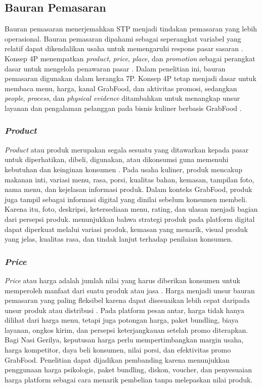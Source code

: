 \subsection{Bauran Pemasaran}
Bauran pemasaran menerjemahkan STP menjadi tindakan pemasaran yang lebih operasional. Bauran pemasaran dipahami sebagai seperangkat variabel yang relatif dapat dikendalikan usaha untuk memengaruhi respons pasar sasaran \parencite{assauri2017manajemenpemasaran,kotler2021marketingmanagement}. Konsep 4P menempatkan \textit{product}, \textit{price}, \textit{place}, dan \textit{promotion} sebagai perangkat dasar untuk mengelola penawaran pasar \parencite{kotler2023principlesmarketing}. Dalam penelitian ini, bauran pemasaran digunakan dalam kerangka 7P. Konsep 4P tetap menjadi dasar untuk membaca menu, harga, kanal GrabFood, dan aktivitas promosi, sedangkan \textit{people}, \textit{process}, dan \textit{physical evidence} ditambahkan untuk menangkap unsur layanan dan pengalaman pelanggan pada bisnis kuliner berbasis GrabFood \parencite{wirtz2024servicesmarketing,ramadhanti2023rucika}.

\subsubsection{\textit{Product}}
\textit{Product} atau produk merupakan segala sesuatu yang ditawarkan kepada pasar untuk diperhatikan, dibeli, digunakan, atau dikonsumsi guna memenuhi kebutuhan dan keinginan konsumen \parencite{kotler2023principlesmarketing}. Pada usaha kuliner, produk mencakup makanan inti, variasi menu, rasa, porsi, kualitas bahan, kemasan, tampilan foto, nama menu, dan kejelasan informasi produk. Dalam konteks GrabFood, produk juga tampil sebagai informasi digital yang dinilai sebelum konsumen membeli. Karena itu, foto, deskripsi, ketersediaan menu, rating, dan ulasan menjadi bagian dari persepsi produk. \textcite{sophia2025rendanggadih} menunjukkan bahwa strategi produk pada platform digital dapat diperkuat melalui variasi produk, kemasan yang menarik, visual produk yang jelas, kualitas rasa, dan tindak lanjut terhadap penilaian konsumen.

\subsubsection{\textit{Price}}
\textit{Price} atau harga adalah jumlah nilai yang harus diberikan konsumen untuk memperoleh manfaat dari suatu produk atau jasa \parencite{kotler2023principlesmarketing}. Harga menjadi unsur bauran pemasaran yang paling fleksibel karena dapat disesuaikan lebih cepat daripada unsur produk atau distribusi \parencite{kotler2021marketingmanagement}. Pada platform pesan antar, harga tidak hanya dilihat dari harga menu, tetapi juga potongan harga, paket bundling, biaya layanan, ongkos kirim, dan persepsi keterjangkauan setelah promo diterapkan. Bagi Nasi Gerilya, keputusan harga perlu mempertimbangkan margin usaha, harga kompetitor, daya beli konsumen, nilai porsi, dan efektivitas promo GrabFood. Penelitian \textcite{sophia2025rendanggadih} dapat dijadikan pembanding karena menunjukkan penggunaan harga psikologis, paket bundling, diskon, voucher, dan penyesuaian harga platform sebagai cara menarik pembelian tanpa melepaskan nilai produk.

